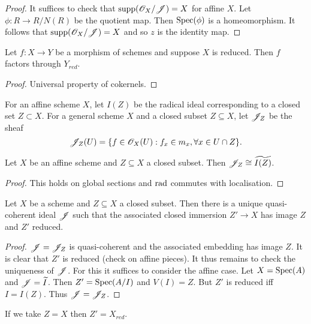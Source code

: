 \documentclass{memoir}
\begin{document}
\begin{proof}
    It suffices to check that $\text{supp}(\mathscr{O}_X/\mathscr{J}) = X$ for affine $X$.
    Let $\phi:R\to R/N(R)$ be the quotient map. Then $\operatorname{Spec}(\phi)$ is a homeomorphism.
    It follows that $\text{supp}(\mathscr{O}_X/\mathscr{J}) = X$ and so $z$ is the identity map.
\end{proof}
\begin{thm}
    Let $f:X\to Y$ be a morphism of schemes and suppose $X$ is reduced.
    Then $f$ factors through $Y_{red}$.
\end{thm}
\begin{proof}
    Universal property of cokernels.
\end{proof}
\begin{definition}
    For an affine scheme $X$, let $I(Z)$ be the radical ideal corresponding to a closed set $Z\subset X$.
    For a general scheme $X$ and a closed subset $Z\subseteq X$, let $\mathscr{J}_Z$ be the sheaf
    \begin{equation}
        \mathscr{J}_Z(U) = \{f\in \mathscr{O}_X(U) : f_x\in m_x, \forall x\in U\cap Z\}.
    \end{equation}
\end{definition}
\begin{lemma}
    Let $X$ be an affine scheme and $Z\subseteq X$ a closed subset. 
    Then $\mathscr{J}_Z\cong \widetilde{I(Z)}$.
\end{lemma}
\begin{proof}
    This holds on global sections and $\text{rad}$ commutes with localisation.
\end{proof}
\begin{thm}
    Let $X$ be a scheme and $Z\subseteq X$ a closed subset.
    Then there is a unique quasi-coherent ideal $\mathscr{J}$ such that the associated closed immersion $Z'\to X$ has image $Z$ and $Z'$ reduced.
\end{thm}
\begin{proof}
    $\mathscr{J} = \mathscr{J}_Z$ is quasi-coherent and the associated embedding has image $Z$.
    It is clear that $Z'$ is reduced (check on affine pieces).
    It thus remains to check the uniqueness of $\mathscr{J}$.
    For this it suffices to consider the affine case.
    Let $X = \operatorname{Spec}(A)$ and $\mathscr{J} = \widetilde I$. 
    Then $Z' = \operatorname{Spec}(A/I)$ and $V(I) = Z$.
    But $Z'$ is reduced iff $I = I(Z)$.
    Thus $\mathscr{J} = \mathscr{J}_{Z}$.
\end{proof}
\begin{remark}
    If we take $Z = X$ then $Z' = X_{red}$.
\end{remark}
\end{document}
